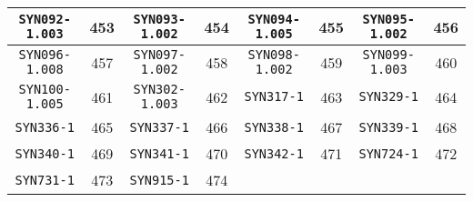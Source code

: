 \documentclass[./main.tex]{subfiles}
\begin{document}
\begin{table}[H]
\begin{tabular}{|c|c|c|c|c|c|c|c|}
\hline
\texttt{SYN092-1.003} & 453 & \texttt{SYN093-1.002} & 454 & \texttt{SYN094-1.005} & 455 & \texttt{SYN095-1.002} & 456\\
\hline
\texttt{SYN096-1.008} & 457 & \texttt{SYN097-1.002} & 458 & \texttt{SYN098-1.002} & 459 & \texttt{SYN099-1.003} & 460\\
\hline
\texttt{SYN100-1.005} & 461 & \texttt{SYN302-1.003} & 462 & \texttt{SYN317-1} & 463 & \texttt{SYN329-1} & 464\\
\hline
\texttt{SYN336-1} & 465 & \texttt{SYN337-1} & 466 & \texttt{SYN338-1} & 467 & \texttt{SYN339-1} & 468\\
\hline
\texttt{SYN340-1} & 469 & \texttt{SYN341-1} & 470 & \texttt{SYN342-1} & 471 & \texttt{SYN724-1} & 472\\
\hline
\texttt{SYN731-1} & 473 & \texttt{SYN915-1} & 474 &  & & &\\
\hline
\end{tabular}
\end{table}
\end{document}
